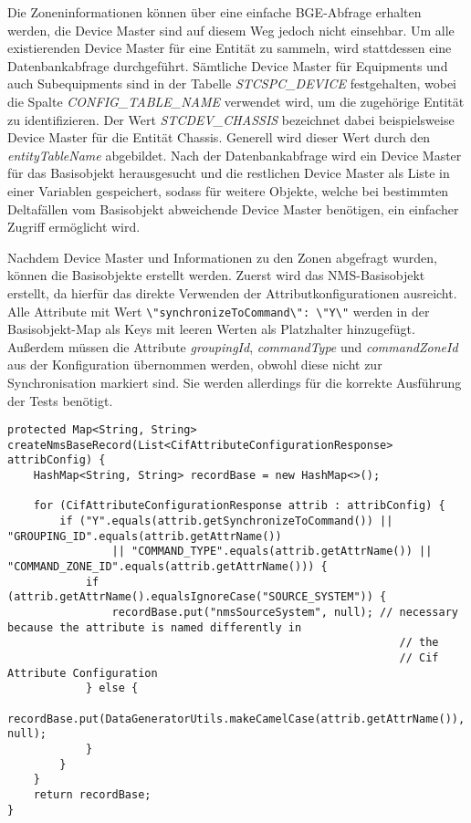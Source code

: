 Die Zoneninformationen können über eine einfache \ac{BGE}-Abfrage erhalten werden, die Device Master sind auf diesem Weg jedoch nicht einsehbar. Um alle existierenden Device Master für eine Entität zu sammeln, wird stattdessen eine Datenbankabfrage durchgeführt. Sämtliche Device Master für Equipments und auch Subequipments sind in der Tabelle \textit{STCSPC\_DEVICE} festgehalten, wobei die Spalte \textit{CONFIG\_TABLE\_NAME} verwendet wird, um die zugehörige Entität zu identifizieren. Der Wert \textit{STCDEV\_CHASSIS} bezeichnet dabei beispielsweise Device Master für die Entität Chassis. Generell wird dieser Wert durch den \textit{entityTableName} abgebildet. Nach der Datenbankabfrage wird ein Device Master für das Basisobjekt herausgesucht und die restlichen Device Master als Liste in einer Variablen gespeichert, sodass für weitere Objekte, welche bei bestimmten Deltafällen vom Basisobjekt abweichende Device Master benötigen, ein einfacher Zugriff ermöglicht wird.

Nachdem Device Master und Informationen zu den Zonen abgefragt wurden, können die Basisobjekte erstellt werden. Zuerst wird das \ac{NMS}-Basisobjekt erstellt, da hierfür das direkte Verwenden der Attributkonfigurationen ausreicht. Alle Attribute mit Wert \colorbox{background}{\lstinline{\"synchronizeToCommand\": \"Y\"}} werden in der Basisobjekt-Map als Keys mit leeren Werten als Platzhalter hinzugefügt. Außerdem müssen die Attribute \textit{groupingId}, \textit{commandType} und \textit{commandZoneId} aus der Konfiguration übernommen werden, obwohl diese nicht zur Synchronisation markiert sind. Sie werden allerdings für die korrekte Ausführung der Tests benötigt.

\begin{lstlisting}[caption=Methode zum Erstellen eines NMS-Basisobjekts, label=nmsBaseRecord,style=Javastyle]
protected Map<String, String> createNmsBaseRecord(List<CifAttributeConfigurationResponse> attribConfig) {
	HashMap<String, String> recordBase = new HashMap<>();

	for (CifAttributeConfigurationResponse attrib : attribConfig) {
		if ("Y".equals(attrib.getSynchronizeToCommand()) || "GROUPING_ID".equals(attrib.getAttrName())
				|| "COMMAND_TYPE".equals(attrib.getAttrName()) || "COMMAND_ZONE_ID".equals(attrib.getAttrName())) {
			if (attrib.getAttrName().equalsIgnoreCase("SOURCE_SYSTEM")) {
				recordBase.put("nmsSourceSystem", null); // necessary because the attribute is named differently in
															// the
															// Cif Attribute Configuration
			} else {
				recordBase.put(DataGeneratorUtils.makeCamelCase(attrib.getAttrName()), null);
			}
		}
	}
	return recordBase;
}
\end{lstlisting}


